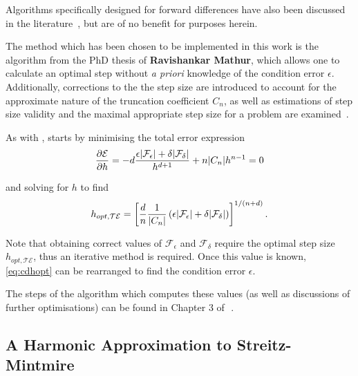 Algorithms specifically designed for forward differences have also been discussed in the literature~\cite{Barton1992}, but are of no benefit for purposes herein.

The method which has been chosen to be implemented in this work is the algorithm from the PhD thesis of \textbf{Ravishankar Mathur}, which allows one to calculate an optimal step without \textit{a priori} knowledge of the condition error $\epsilon$.
Additionally, corrections to the the step size are introduced to account for the approximate nature of the truncation coefficient $C_n$, as well as estimations of step size validity and the maximal appropriate step size for a problem are examined~\cite{Mathur2012}.

As with \citeauthor{Gill1982}, \citeauthor{Mathur2012} starts by minimising the total error expression
\begin{equation}
\frac{\partial\mathcal{E}}{\partial h} = -d\frac{\epsilon\lvert\mathcal{F}_\epsilon\rvert+\delta\lvert\mathcal{F}_\delta\rvert}{h^{d+1}} + n\lvert C_n\rvert h^{n-1} = 0
\end{equation}

and solving for $h$ to find
\begin{equation}
h_{opt,\mathcal{TE}} = \left[\frac{d}{n}\frac{1}{\lvert C_n\rvert}\left(\epsilon\lvert\mathcal{F}_\epsilon\rvert+
\delta\lvert\mathcal{F}_\delta\rvert\right)\right]^{1/(n+d)}.\label{eq:cdhopt}
\end{equation}

Note that obtaining correct values of $\mathcal{F}_\epsilon$ and $\mathcal{F}_\delta$ require the optimal step size $h_{opt,\mathcal{TE}}$, thus an iterative method is required.
Once this value is known, \cref{eq:cdhopt} can be rearranged to find the condition error $\epsilon$.

The steps of the algorithm which computes these values (as well as discussions of further optimisations) can be found in Chapter 3 of~\,.

\subsection{A Harmonic Approximation to Streitz-Mintmire}\label{subsec:harmsm}

